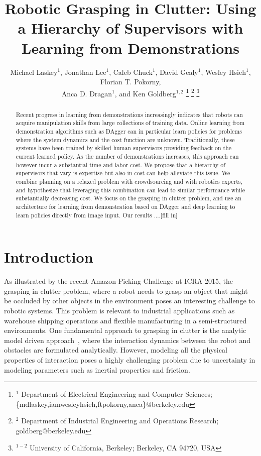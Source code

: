 \documentclass[10pt, conference]{ieeeconf}      %
\title{Robotic Grasping in Clutter: Using a Hierarchy of Supervisors with Learning from Demonstrations}
\author{Michael Laskey$^1$, Jonathan Lee$^1$, Caleb Chuck$^1$, David Gealy$^1$, Wesley Hsieh$^1$, Florian T. Pokorny,\\
 Anca D. Dragan$^1$, and Ken Goldberg$^{1,2}$%
\thanks{$^1$ Department of Electrical Engineering and Computer Sciences; {\small \{mdlaskey,iamwesleyhsieh,ftpokorny,anca\}@berkeley.edu} }%
\thanks{$^2$ Department of Industrial Engineering and Operations Research; {\small goldberg@berkeley.edu}}%
\thanks{$^{1-2}$ University of California, Berkeley;  Berkeley, CA 94720, USA}%
}
\begin{document}
\maketitle
\thispagestyle{empty}
\pagestyle{empty}



\begin{abstract}
Recent progress in learning from demonstrations increasingly indicates that robots can acquire manipulation skills from
large collections of training data. Online learning from demonstration algorithms such as DAgger can in particular learn
policies for problems where the system dynamics and the cost function are unknown. Traditionally, these systems have
been trained by skilled human supervisors providing feedback on the current learned policy. As the number of
demonstrations increases, this approach can however incur a substantial time and labor cost. We propose that a hierarchy of supervisors that vary is expertise but also in cost can help alleviate this issue. We combine planning on a relaxed problem with crowdsourcing and with robotics experts, and hypothesize that leveraging this combination can lead to similar performance while substantially decreasing cost. We focus on the grasping in clutter problem, and use an architecture for learning from demonstration based on DAgger and deep learning to learn policies directly from image input. Our results ....[fill in]

 \end{abstract}



\section{Introduction} 
As illustrated by the recent Amazon Picking Challenge at ICRA 2015, the grasping in clutter problem, where a robot needs
to grasp an object that might be occluded by other objects in the environment poses an interesting challenge to robotic
systems. This problem is relevant to industrial applications such as warehouse shipping operations and flexible manufacturing in a semi-structured environments. One fundamental approach to grasping in clutter is the analytic model driven approach~\cite{bicchi2000robotic},
where the interaction dynamics between the robot and obstacles are formulated analytically. However, modeling all the 
physical properties of interaction poses a highly challenging problem due to uncertainty in modeling parameters such as
inertial properties and friction. 
\end{document}
